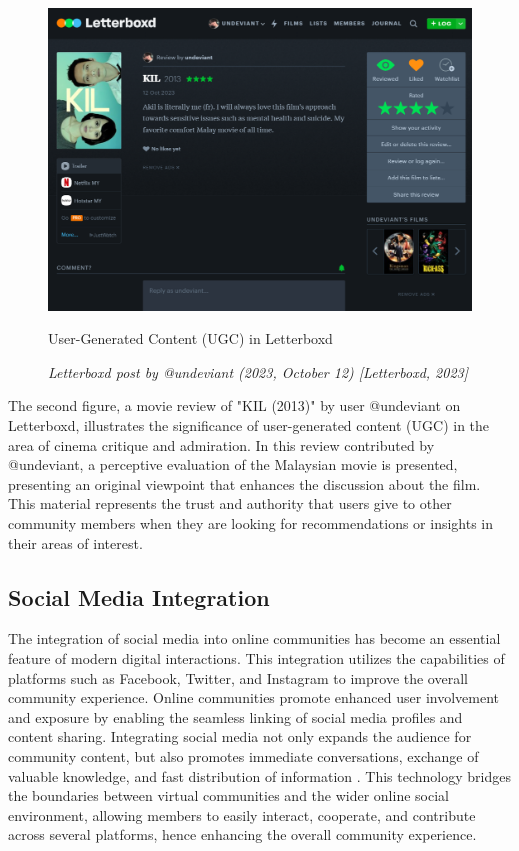 \begin{figure}[h]
    \centering
    \includegraphics[width=0.8\linewidth]{mainmatter/images/ugc2.png}
    \caption{User-Generated Content (UGC) in Letterboxd}
    \caption*{\textit{Letterboxd post by @undeviant (2023, October 12) [Letterboxd, 2023]}}
    \label{fig:myfig4}
\end{figure}
The second figure, a movie review of "KIL (2013)" by user @undeviant on Letterboxd, illustrates the significance of user-generated content (UGC) in the area of cinema critique and admiration. In this review contributed by @undeviant, a perceptive evaluation of the Malaysian movie is presented, presenting an original viewpoint that enhances the discussion about the film. This material represents the trust and authority that users give to other community members when they are looking for recommendations or insights in their areas of interest.

\subsection{Social Media Integration}
The integration of social media into online communities has become an essential feature of modern digital interactions. This integration utilizes the capabilities of platforms such as Facebook, Twitter, and Instagram to improve the overall community experience. Online communities promote enhanced user involvement and exposure by enabling the seamless linking of social media profiles and content sharing. Integrating social media not only expands the audience for community content, but also promotes immediate conversations, exchange of valuable knowledge, and fast distribution of information \parencite{zanuar22}. This technology bridges the boundaries between virtual communities and the wider online social environment, allowing members to easily interact, cooperate, and contribute across several platforms, hence enhancing the overall community experience.

